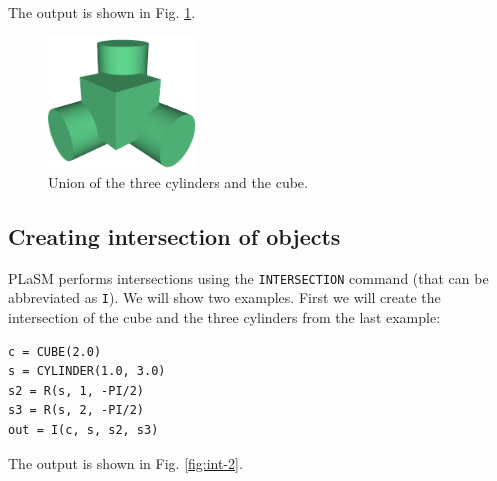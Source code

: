 \noindent
The output is shown in Fig. \ref{fig:union}.\\


\begin{figure}[!ht]
\begin{center}
\includegraphics[width=0.35\textwidth]{img/diff-3.png}
\end{center}
\vspace{-4mm}
\caption{Union of the three cylinders and the cube.}
\label{fig:union}
\end{figure}


\subsection{Creating intersection of objects}\label{subsec:intersection}

PLaSM performs intersections using the {\tt INTERSECTION} command (that can be 
abbreviated as {\tt I}). We will show two examples. First we will create the 
intersection of the cube and the three cylinders from the last example:\\
 
\begin{bbox}
\begin{verbatim}
c = CUBE(2.0)
s = CYLINDER(1.0, 3.0)
s2 = R(s, 1, -PI/2)
s3 = R(s, 2, -PI/2)
out = I(c, s, s2, s3) 
\end{verbatim}
\end{bbox}
\vspace{6mm}

\noindent
The output is shown in Fig. \ref{fig:int-2}.

